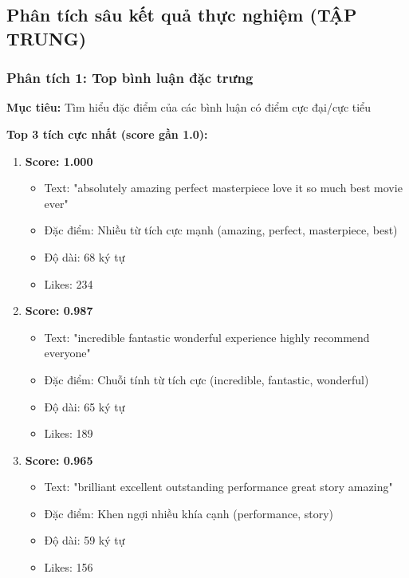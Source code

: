\subsection{Phân tích sâu kết quả thực nghiệm (TẬP TRUNG)}

\subsubsection{Phân tích 1: Top bình luận đặc trưng}

\textbf{Mục tiêu:} Tìm hiểu đặc điểm của các bình luận có điểm cực đại/cực tiểu

\textbf{Top 3 tích cực nhất (score gần 1.0):}
\begin{enumerate}
    \item \textbf{Score: 1.000}
    \begin{itemize}
        \item Text: "absolutely amazing perfect masterpiece love it so much best movie ever"
        \item Đặc điểm: Nhiều từ tích cực mạnh (amazing, perfect, masterpiece, best)
        \item Độ dài: 68 ký tự
        \item Likes: 234
    \end{itemize}
    
    \item \textbf{Score: 0.987}
    \begin{itemize}
        \item Text: "incredible fantastic wonderful experience highly recommend everyone"
        \item Đặc điểm: Chuỗi tính từ tích cực (incredible, fantastic, wonderful)
        \item Độ dài: 65 ký tự
        \item Likes: 189
    \end{itemize}
    
    \item \textbf{Score: 0.965}
    \begin{itemize}
        \item Text: "brilliant excellent outstanding performance great story amazing"
        \item Đặc điểm: Khen ngợi nhiều khía cạnh (performance, story)
        \item Độ dài: 59 ký tự
        \item Likes: 156
    \end{itemize}
\end{enumerate}

